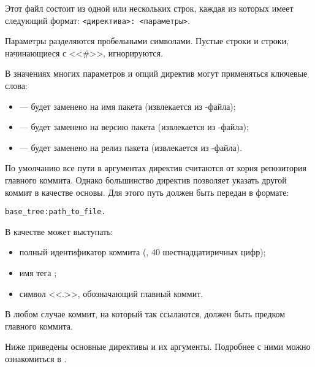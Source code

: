 Этот файл состоит из одной или нескольких строк, каждая из которых имеет следующий формат: \verb!<директива>: <параметры>!.

Параметры разделяются пробельными символами.
Пустые строки и строки, начинающиеся с <<\#>>, игнорируются.

В значениях многих параметров и опций директив могут применяться ключевые слова:
\begin{itemize}
	\item {} --- будет заменено на имя пакета (извлекается из -файла);
	\item {} --- будет заменено на версию пакета (извлекается из -файла);
	\item {} --- будет заменено на релиз пакета (извлекается из -файла).
\end{itemize}


По умолчанию все пути в аргументах директив считаются от корня репозитория главного коммита.
Однако большинство директив позволяет указать другой коммит в качестве основы. Для этого путь
должен быть передан в формате:
\begin{verbatim}
base_tree:path_to_file.
\end{verbatim}

В качестве  может выступать:
\begin{itemize}
	\item полный идентификатор коммита (, 40 шестнадцатиричных цифр);
	\item имя тега ;
	\item символ <<.>>, обозначающий главный коммит.
\end{itemize}

В любом случае коммит, на который так ссылаются, должен быть предком главного коммита.


Ниже приведены основные директивы  и их аргументы. Подробнее с ними можно
ознакомиться в .

